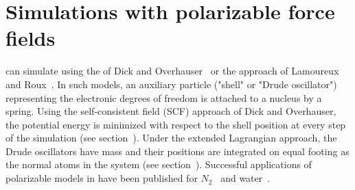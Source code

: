 \section{Simulations with polarizable force fields}
\label{sec:polarize}
{\gromacs} can simulate  using the 
 of Dick and Overhauser~\cite{Dick58} or the
 approach of Lamoureux and Roux~\cite{Lamoureux2003a}. 
In such models, an auxiliary particle ("shell" or "Drude oscillator") representing 
the electronic degrees of freedom is attached to a nucleus by a spring. 
Using the self-consistent field (SCF) approach of Dick and Overhauser, the 
potential energy is minimized with respect to the shell position 
at every step of the simulation (see section~).  Under the extended Lagrangian approach,
the Drude oscillators have mass and their positions are integrated on equal footing
as the normal atoms in the system (see section~).
Successful applications of polarizable models in {\gromacs} have been published
for $N_2$~\cite{Jordan95} and water~\cite{Maaren2001a}.


